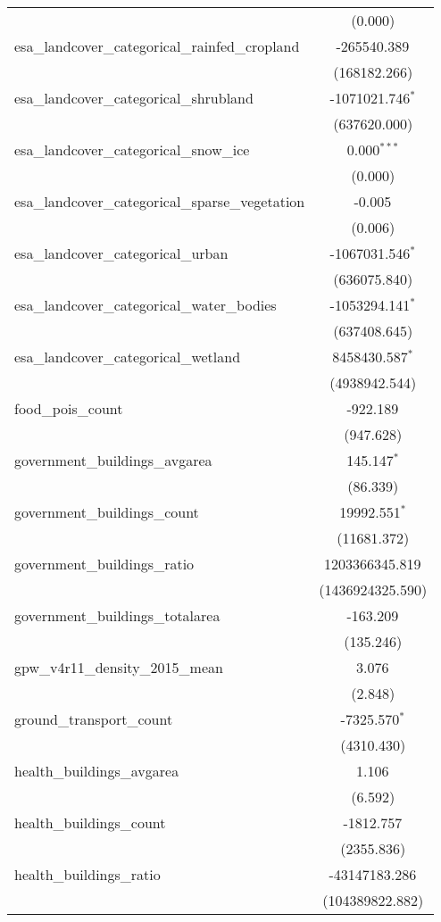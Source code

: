 \begin{table}[!htbp]
\begin{tabular}{@{\extracolsep{5pt}}lc}
  & (0.000) \\
 esa_landcover_categorical_rainfed_cropland & -265540.389$^{}$ \\
  & (168182.266) \\
 esa_landcover_categorical_shrubland & -1071021.746$^{*}$ \\
  & (637620.000) \\
 esa_landcover_categorical_snow_ice & 0.000$^{***}$ \\
  & (0.000) \\
 esa_landcover_categorical_sparse_vegetation & -0.005$^{}$ \\
  & (0.006) \\
 esa_landcover_categorical_urban & -1067031.546$^{*}$ \\
  & (636075.840) \\
 esa_landcover_categorical_water_bodies & -1053294.141$^{*}$ \\
  & (637408.645) \\
 esa_landcover_categorical_wetland & 8458430.587$^{*}$ \\
  & (4938942.544) \\
 food_pois_count & -922.189$^{}$ \\
  & (947.628) \\
 government_buildings_avgarea & 145.147$^{*}$ \\
  & (86.339) \\
 government_buildings_count & 19992.551$^{*}$ \\
  & (11681.372) \\
 government_buildings_ratio & 1203366345.819$^{}$ \\
  & (1436924325.590) \\
 government_buildings_totalarea & -163.209$^{}$ \\
  & (135.246) \\
 gpw_v4r11_density_2015_mean & 3.076$^{}$ \\
  & (2.848) \\
 ground_transport_count & -7325.570$^{*}$ \\
  & (4310.430) \\
 health_buildings_avgarea & 1.106$^{}$ \\
  & (6.592) \\
 health_buildings_count & -1812.757$^{}$ \\
  & (2355.836) \\
 health_buildings_ratio & -43147183.286$^{}$ \\
  & (104389822.882) \\

\end{tabular}
\end{table}
